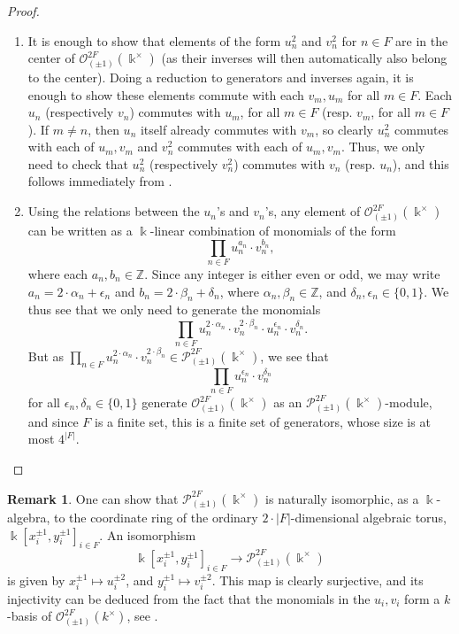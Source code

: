 \documentclass{amsart}
\theoremstyle{definition}
\newtheorem{rem}[equation]{Remark}
\renewcommand{\k}{\Bbbk}
\numberwithin{equation}{section}
\begin{document}
\begin{proof}\quad
\begin{enumerate}
\item It is enough to show that elements of the form $u_n^2$ and $v_n^2$ for $n \in F$ are in the center of $\mathcal{O}^{2F}_{(\pm 1)}(\k^{\times})$ (as their inverses will then automatically also belong to the center). Doing a reduction to generators and inverses again,
it is enough to show these elements commute with each $v_m, u_m$ for all $m \in F$. Each $u_n$ (respectively $v_n$) commutes with $u_m$, for all $m\in F$ (resp. $v_m$, for all $m \in F$).
If $m\ne n$,
then $u_n$ itself already commutes with $v_m$,
so clearly $u_n^2$ commutes with each of $u_m, v_m$ and $v_n^2$ commutes with each of $u_m, v_m$.
Thus, we only need to check that $u_n^2$ (respectively $v_n^2$) commutes with $v_n$ (resp. $u_n$),
and this follows immediately from .
\item Using the relations between the $u_n$'s and $v_n$'s,
any element of $\mathcal{O}^{2F}_{(\pm 1)}(\k^{\times})$ can be written as a $\k$-linear combination of monomials of the form
\[
\prod_{n \in F} u_n^{a_n} \cdot v_n^{b_n},
\]
where each $a_n, b_n \in \mathbb{Z}$.
Since any integer is either even or odd,
we may write $a_n = 2\cdot \alpha_n + \epsilon_n$ and $b_n = 2\cdot \beta_n + \delta_n$, 
where $\alpha_n, \beta_n \in \mathbb{Z}$, and $\delta_n, \epsilon_n \in \{0,1\}$.
We thus see that we only need to generate the monomials
\[
\prod_{n \in F} u_n^{2\cdot \alpha_n} \cdot v_n^{2\cdot \beta_n} \cdot u_n^{\epsilon_n}\cdot v_n^{\delta_n}.
\]
But as $\prod_{n \in F} u_n^{2\cdot \alpha_n} \cdot v_n^{2\cdot \beta_n} \in \mathcal{P}^{2F}_{(\pm 1)}(\k^{\times})$,
we see that 
\[
\prod_{n \in F} u_n^{\epsilon_n}\cdot v_n^{\delta_n}
\]
for all $\epsilon_n, \delta_n \in \{0,1\}$
generate $\mathcal{O}^{2F}_{(\pm 1)}(\k^{\times})$ as an  $\mathcal{P}^{2F}_{(\pm 1)}(\k^{\times})$-module,
and since $F$ is a finite set,
this is a finite set of generators,
whose size is at most $4^{|F|}$.
\end{enumerate}    
\end{proof}

\begin{rem}
One can show that $\mathcal{P}^{2F}_{(\pm 1)}(\k^{\times})$ is naturally isomorphic, as a $\k$-algebra, to the coordinate ring of the ordinary $2\cdot|F|$-dimensional algebraic torus, $\k[x_i^{\pm 1},y_i^{\pm 1}]_{i \in F}$.
An isomorphism 
\[
\k[x_i^{\pm 1},y_i^{\pm 1}]_{i \in F} \to \mathcal{P}^{2F}_{(\pm 1)}(\k^{\times})
\]
is given 
by $x_i^{\pm 1} \mapsto u_i^{\pm 2}$,
and $y_i^{\pm 1} \mapsto v_i^{\pm 2}$.
This map is clearly surjective,
and its injectivity can be deduced from the fact that the monomials in the $u_i, v_i$ form a $k$-basis of $\mathcal{O}^{2F}_{(\pm 1)}(k^{\times})$, see \cite[Example 1.5.10(ii)]{NCBook}.
\end{rem}
\end{document}
